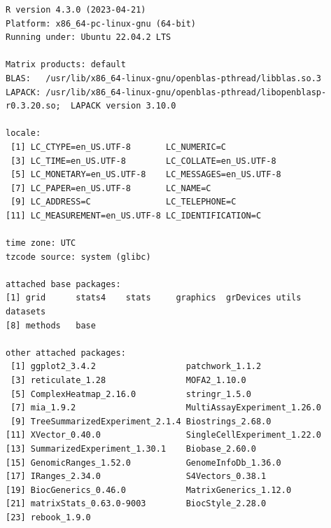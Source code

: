 \documentclass[
]{book}
\begin{document}
\begin{verbatim}
R version 4.3.0 (2023-04-21)
Platform: x86_64-pc-linux-gnu (64-bit)
Running under: Ubuntu 22.04.2 LTS

Matrix products: default
BLAS:   /usr/lib/x86_64-linux-gnu/openblas-pthread/libblas.so.3 
LAPACK: /usr/lib/x86_64-linux-gnu/openblas-pthread/libopenblasp-r0.3.20.so;  LAPACK version 3.10.0

locale:
 [1] LC_CTYPE=en_US.UTF-8       LC_NUMERIC=C              
 [3] LC_TIME=en_US.UTF-8        LC_COLLATE=en_US.UTF-8    
 [5] LC_MONETARY=en_US.UTF-8    LC_MESSAGES=en_US.UTF-8   
 [7] LC_PAPER=en_US.UTF-8       LC_NAME=C                 
 [9] LC_ADDRESS=C               LC_TELEPHONE=C            
[11] LC_MEASUREMENT=en_US.UTF-8 LC_IDENTIFICATION=C       

time zone: UTC
tzcode source: system (glibc)

attached base packages:
[1] grid      stats4    stats     graphics  grDevices utils     datasets 
[8] methods   base     

other attached packages:
 [1] ggplot2_3.4.2                  patchwork_1.1.2               
 [3] reticulate_1.28                MOFA2_1.10.0                  
 [5] ComplexHeatmap_2.16.0          stringr_1.5.0                 
 [7] mia_1.9.2                      MultiAssayExperiment_1.26.0   
 [9] TreeSummarizedExperiment_2.1.4 Biostrings_2.68.0             
[11] XVector_0.40.0                 SingleCellExperiment_1.22.0   
[13] SummarizedExperiment_1.30.1    Biobase_2.60.0                
[15] GenomicRanges_1.52.0           GenomeInfoDb_1.36.0           
[17] IRanges_2.34.0                 S4Vectors_0.38.1              
[19] BiocGenerics_0.46.0            MatrixGenerics_1.12.0         
[21] matrixStats_0.63.0-9003        BiocStyle_2.28.0              
[23] rebook_1.9.0                  


\end{verbatim}
\end{document}

